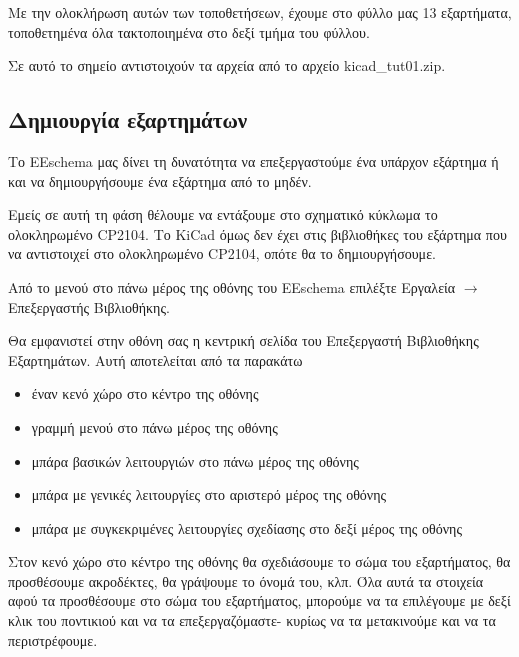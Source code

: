 \documentclass[a4paper]{article}
\begin{document}
Με την ολοκλήρωση αυτών των τοποθετήσεων, έχουμε στο φύλλο μας 13 εξαρτήματα, τοποθετημένα όλα τακτοποιημένα στο δεξί τμήμα του φύλλου.

\begin{figure}
  \begin{center}
    \label{fig:kicad-main}
  \end{center}
\end{figure}

Σε αυτό το σημείο αντιστοιχούν τα αρχεία από το αρχείο kicad\_tut01.zip.

\subsection{Δημιουργία εξαρτημάτων}
Το \textenglish{EEschema} μας δίνει τη δυνατότητα να επεξεργαστούμε ένα υπάρχον εξάρτημα ή και να δημιουργήσουμε ένα εξάρτημα από το μηδέν.

Εμείς σε αυτή τη φάση θέλουμε να εντάξουμε στο σχηματικό κύκλωμα το ολοκληρωμένο \textenglish{CP2104}. Το \textenglish{KiCad} όμως δεν έχει στις βιβλιοθήκες του εξάρτημα που να αντιστοιχεί στο ολοκληρωμένο \textenglish{CP2104}, οπότε θα το δημιουργήσουμε.

Από το μενού στο πάνω μέρος της οθόνης του \textenglish{EEschema} επιλέξτε Εργαλεία $\rightarrow$ Επεξεργαστής Βιβλιοθήκης.

Θα εμφανιστεί στην οθόνη σας η κεντρική σελίδα του Επεξεργαστή Βιβλιοθήκης Εξαρτημάτων. Αυτή αποτελείται από τα παρακάτω
\begin{itemize}
    \item έναν κενό χώρο στο κέντρο της οθόνης
    \item γραμμή μενού στο πάνω μέρος της οθόνης
    \item μπάρα βασικών λειτουργιών στο πάνω μέρος της οθόνης
    \item μπάρα με γενικές λειτουργίες στο αριστερό μέρος της οθόνης
    \item μπάρα με συγκεκριμένες λειτουργίες σχεδίασης στο δεξί μέρος της οθόνης
\end{itemize}

Στον κενό χώρο στο κέντρο της οθόνης θα σχεδιάσουμε το σώμα του εξαρτήματος, θα προσθέσουμε ακροδέκτες, θα γράψουμε το όνομά του, κλπ. Όλα αυτά τα στοιχεία αφού τα προσθέσουμε στο σώμα του εξαρτήματος, μπορούμε να τα επιλέγουμε με δεξί κλικ του ποντικιού και να τα επεξεργαζόμαστε- κυρίως να τα μετακινούμε και να τα περιστρέφουμε.
\end{document}
